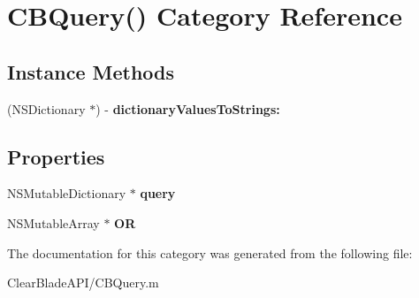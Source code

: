 \hypertarget{category_c_b_query_07_08}{\section{C\+B\+Query() Category Reference}
\label{category_c_b_query_07_08}
}
\subsection*{Instance Methods}
\begin{DoxyCompactItemize}
\item 
\hypertarget{category_c_b_query_07_08_abec846bf09cf27bb81de57485416d516}{(N\+S\+Dictionary $\ast$) -\/ {\bfseries dictionary\+Values\+To\+Strings\+:}}\label{category_c_b_query_07_08_abec846bf09cf27bb81de57485416d516}

\end{DoxyCompactItemize}
\subsection*{Properties}
\begin{DoxyCompactItemize}
\item 
\hypertarget{category_c_b_query_07_08_a44c199651c37b422ba5d9b2ee0f70150}{N\+S\+Mutable\+Dictionary $\ast$ {\bfseries query}}\label{category_c_b_query_07_08_a44c199651c37b422ba5d9b2ee0f70150}

\item 
\hypertarget{category_c_b_query_07_08_add581855d14363fa3de237576f8fbb57}{N\+S\+Mutable\+Array $\ast$ {\bfseries O\+R}}\label{category_c_b_query_07_08_add581855d14363fa3de237576f8fbb57}

\end{DoxyCompactItemize}


The documentation for this category was generated from the following file\+:\begin{DoxyCompactItemize}
\item 
Clear\+Blade\+A\+P\+I/C\+B\+Query.\+m\end{DoxyCompactItemize}
